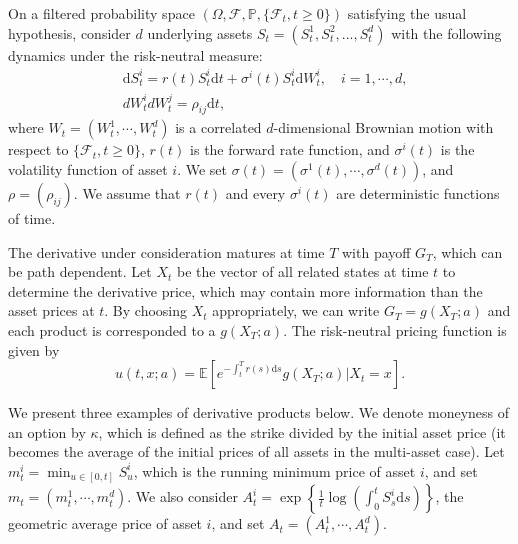 \documentclass[11pt,a4paper]{article}
\theoremstyle{remark}
\begin{document}
	On a filtered probability space $(\Omega, \mathcal{F}, \mathbb{P}, \{\mathcal{F}_t, t\ge 0\})$ satisfying the usual hypothesis, consider $d$ underlying assets $S_t = (S^1_t, S^2_t,..., S^d_t)$ with the following dynamics under the risk-neutral measure:
	\begin{align}
		&\mathrm{d} S_t^i  = r(t) S_t^i \mathrm{d} t+\sigma^i(t) S_t^i\mathrm{d} W_t^{i},\quad i=1,\cdots,d, \label{eq:GBM}\\
		& dW^i_tdW^j_t  = \rho_{ij} \mathrm{d}t,
	\end{align}
	where $W_t=(W^1_t,\cdots,W^d_t)$ is a correlated $d$-dimensional Brownian motion with respect to $\{\mathcal{F}_t, t\ge 0\}$, 
	$r(t)$ is the forward rate function, and $\sigma^i(t)$ is the volatility function of asset $i$. We set $\sigma(t)=(\sigma^1(t),\cdots,\sigma^d(t))$, and $\rho=(\rho_{ij})$.
	We assume that $r(t)$ and every $\sigma^i(t)$ are deterministic functions of time. 
	
	The derivative under consideration matures at time $T$ with payoff $G_T$, which can be path dependent. Let $X_t$ be the vector of all related states at time $t$ to determine the derivative price, which may contain more information than the asset prices at $t$. By choosing $X_t$ appropriately, we can write $G_T=g(X_T;a)$ and each product is corresponded to a $g(X_T;a)$. The risk-neutral pricing function is given by
	\begin{equation}
		u(t, x; a) =\mathbb{E}\left[  e^{-\int_t^T r(s) \mathrm{d} s} \left. g(X_T;a) \right| X_t=x\right].\label{eq:price-function}
	\end{equation}
	
	We present three examples of derivative products below. We denote moneyness of an option by $\kappa$, which is defined as the strike divided by the initial asset price (it becomes the average of the initial prices of all assets in the multi-asset case).
	Let $m^i_t=\min_{u\in [0,t]}S^i_u$, which is the running minimum price of asset $i$, and set $m_t=(m^1_t,\cdots,m^d_t)$. We also consider $A^i_t = \exp\left\{\frac{1}{t}\log\left(\int_0^t S^i_s \mathrm{d} s\right)\right\}$, the geometric average price of asset $i$, and set $A_t=(A^1_t,\cdots,A^d_t)$.
	
\end{document}
